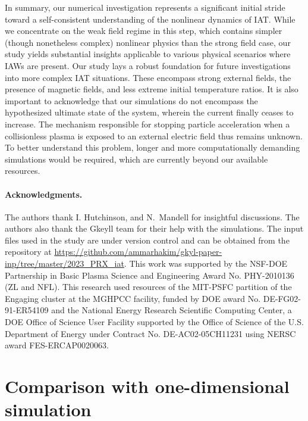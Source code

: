 \documentclass[%
 reprint,
 amsmath,
 amssymb,
 aps,
 prx,
floatfix,
superscriptaddress
]{revtex4-2}
\begin{document}
In summary, our numerical investigation represents a significant initial stride toward a self-consistent understanding of the nonlinear dynamics of IAT. 
While we concentrate on the weak field regime in this step, which contains simpler (though nonetheless complex) nonlinear physics than the strong field case, our study yields substantial insights applicable to various physical scenarios where IAWs are present.
Our study lays a robust foundation for future investigations into more complex IAT situations. 
These encompass strong external fields, the presence of magnetic fields, and less extreme initial temperature ratios. 
It is also important to acknowledge that our simulations do not encompass the hypothesized ultimate state of the system, wherein the current finally ceases to increase. 
The mechanism responsible for stopping particle acceleration when a collisionless plasma is exposed to an external electric field thus remains unknown. 
To better understand this problem, longer and more computationally demanding simulations would be required, which are currently beyond our available resources.




\paragraph*{Acknowledgments.}
The authors thank I. Hutchinson, and N.~Mandell for insightful discussions.
The authors also thank the Gkeyll team for their help with the simulations.
The input files used in the study are under version control and can be obtained from the repository at \url{https://github.com/ammarhakim/gkyl-paper-inp/tree/master/2023_PRX_iat}.
This work was supported by the NSF-DOE Partnership in Basic Plasma Science and Engineering Award No. PHY-2010136 (ZL and NFL).
This research used resources of the MIT-PSFC partition of the Engaging cluster at the MGHPCC facility, funded by DOE award No. DE-FG02-91-ER54109 and the National Energy Research Scientific Computing Center, a DOE Office of Science User Facility supported by the Office of Science of the U.S. Department of Energy under Contract No. DE-AC02-05CH11231 using NERSC award FES-ERCAP0020063.


\appendix

\section{Comparison with one-dimensional simulation~\label{app:1}}
\end{document}
